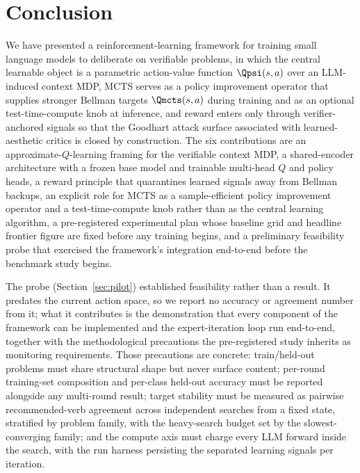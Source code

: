 \section{Conclusion}
\label{sec:conclusion}

We have presented a reinforcement-learning framework for training small
language models to deliberate on verifiable problems, in which the central
learnable object is a parametric action-value function $\Qpsi(s, a)$ over
an LLM-induced context MDP, MCTS serves as a policy improvement operator
that supplies stronger Bellman targets $\Qmcts(s, a)$ during training and
as an optional test-time-compute knob at inference, and reward enters only
through verifier-anchored signals so that the Goodhart attack surface
associated with learned-aesthetic critics is closed by construction. The
six contributions are an approximate-$Q$-learning framing for the
verifiable context MDP, a shared-encoder architecture with a frozen base
model and trainable multi-head $Q$ and policy heads, a reward principle
that quarantines learned signals away from Bellman backups, an explicit
role for MCTS as a sample-efficient policy improvement operator and a
test-time-compute knob rather than as the central learning algorithm,
a pre-registered experimental plan whose baseline grid and headline
frontier figure are fixed before any training begins, and a preliminary
feasibility probe that exercised the framework's integration end-to-end
before the benchmark study begins.

The probe (Section~\ref{sec:pilot}) established feasibility rather than a
result. It predates the current action space, so we report no accuracy or
agreement number from it; what it contributes is the demonstration that every
component of the framework can be implemented and the expert-iteration loop run
end-to-end, together with the methodological precautions the pre-registered
study inherits as monitoring requirements. Those precautions are concrete:
train/held-out problems must share structural shape but never surface content;
per-round training-set composition and per-class held-out accuracy must be
reported alongside any multi-round result; target stability must be measured as
pairwise recommended-verb agreement across independent searches from a fixed
state, stratified by problem family, with the heavy-search budget set by the
slowest-converging family; and the compute axis must charge every LLM forward
inside the search, with the run harness persisting the separated learning
signals per iteration.

